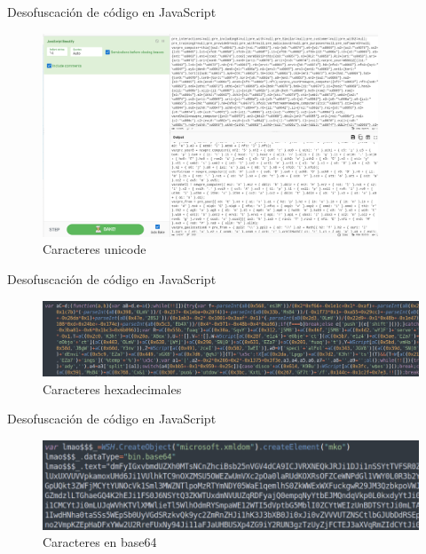 \documentclass[aspectratio=169]{beamer}
\begin{document}
  
  	\begin{frame}{Desofuscación de código en JavaScript}
  		
  		\begin{figure}[H]
  			\centering
  			\includegraphics[width=10cm]{images/unicode.png}
  			\caption{Caracteres unicode}
  		\end{figure}
  	\end{frame}
	\begin{frame}{Desofuscación de código en JavaScript}
		
		\begin{figure}[H]
			\centering
			\includegraphics[width=12cm]{images/hexadecimal.png}
			\caption{Caracteres hexadecimales}
		\end{figure}
	\end{frame}
     
   	\begin{frame}{Desofuscación de código en JavaScript}
   		
   		\begin{figure}[H]
   			\centering
   			\includegraphics[width=12cm]{images/base64.png}
   			\caption{Caracteres en base64}
   		\end{figure}
   	\end{frame}
      
\end{document}
